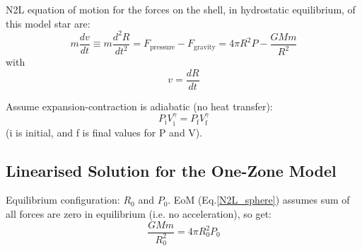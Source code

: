 \documentclass{spy}
\begin{document}
N2L equation of motion for the forces on the shell, in hydrostatic equilibrium, of this model star are:
\begin{equation}
    m\frac{dv}{dt} \equiv m\frac{d^2R}{dt^2}= F_\mathrm{pressure} - F_\mathrm{gravity} 
    = 4 \pi R^2 P - \frac{GMm}{R^2}
    \label{N2L_sphere}
\end{equation}
with
\begin{equation}
    v = \frac{dR}{dt}
    \label{vdrdt}
\end{equation}

Assume expansion-contraction is adiabatic (no heat transfer):
\begin{equation}
    P_\mathrm{i} V_\mathrm{i}^\gamma = P_\mathrm{f} V_\mathrm{f}^\gamma
    \label{adiabatic}
\end{equation}
(i is initial, and f is final values for P and V).



\subsection{Linearised Solution for the One-Zone Model}
Equilibrium configuration: \(R_\mathrm{0}\) and \(P_\mathrm{0}\).  EoM (Eq.\ref{N2L_sphere}) assumes sum of all forces are zero in equilibrium (i.e. no acceleration), so get: 
\begin{equation}
     \frac{GMm}{R^2_\mathrm{0}} = 4\pi R^2_\mathrm{0} P_\mathrm{0}
     \label{star_equilibrium}
\end{equation}
\end{document}
